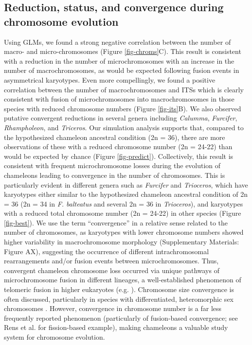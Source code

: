 \documentclass[a4paper, 12pt]{article}
\begin{document}
\subsection{Reduction, status, and convergence during chromosome evolution}
Using GLMs, we found a strong negative correlation between the number of macro- and micro-chromosomes (Figure \ref{fig-chroms}C). 
This result is consistent with a reduction in the number of microchromosomes with an increase in the number of macrochromosomes, as would be expected following fusion events in asymmetrical karyotypes. 
Even more compellingly, we found a positive correlation between the number of macrochromosomes and ITSs which is clearly consistent with fusion of microchromosomes into macrochromosomes in those species with reduced chromosome numbers (Figure \ref{fig-its}B). 
We also observed putative convergent reductions in several genera including \textit{Calumma}, \textit{Furcifer}, \textit{Rhampholeon}, and \textit{Triceros}. 
Our simulation analysis supports that, compared to the hypothesized chameleon ancestral condition (2n = 36), there are more observations of these with a reduced chromosome number (2n = 24-22) than would be expected by chance (Figure \ref{fig-predict}). 
Collectively, this result is consistent with frequent microchromosome losses during the evolution of chameleons leading to convergence in the number of chromosomes. 
This is particularly evident in different genera such as \textit{Furcifer} and \textit{Trioceros}, which have karyotypes either similar to the hypothesized chameleon ancestral condition of 2n = 36 (2n = 34 in \textit{F. balteatus} and several 2n = 36 in \textit{Trioceros}), and karyotypes with a reduced total chromosome number (2n = 24-22) in other species (Figure \ref{fig-best}). 
We use the term ``convergence'' in a relative sense related to the number of chromosomes, as karyotypes with lower chromosome numbers showed higher variability in macrochromosome morphology (Supplementary Materials: Figure AX), suggesting the occurrence of different intrachromosomal rearrangements and/or fusion events between microchromosomes. 
Thus, convergent chameleon chromosome loss occurred via unique pathways of microchromosome fusion in different lineages, a well-established phenomenon of telomeric fusion in higher eukaryotes (e.g. \citealt{heacock2004molecular}).  
Chromosome size convergence is often discussed, particularly in species with differentiated, heteromorphic sex chromosomes \citep{montiel2017discovery,kratochvil2021sex}. 
However, convergence in chromosome number is a far less frequently reported phenomenon (particularly of fusion-based convergence; see Rens et al. \citeyear{rens2003reversal} for fission-based example), making chameleons a valuable study system for chromosome evolution. 
\end{document}
